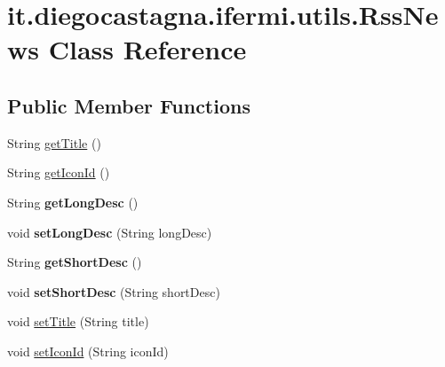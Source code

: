 \hypertarget{classit_1_1diegocastagna_1_1ifermi_1_1utils_1_1_rss_news}{}\section{it.\+diegocastagna.\+ifermi.\+utils.\+Rss\+News Class Reference}
\label{classit_1_1diegocastagna_1_1ifermi_1_1utils_1_1_rss_news}
\subsection*{Public Member Functions}
\begin{DoxyCompactItemize}
\item 
String \mbox{\hyperlink{classit_1_1diegocastagna_1_1ifermi_1_1utils_1_1_rss_news_a440a726406ac659484bbc5abca1e6e58}{get\+Title}} ()
\item 
String \mbox{\hyperlink{classit_1_1diegocastagna_1_1ifermi_1_1utils_1_1_rss_news_a4058acee8ab782ebc158d03d48212040}{get\+Icon\+Id}} ()
\item 
\mbox{\label{classit_1_1diegocastagna_1_1ifermi_1_1utils_1_1_rss_news_afff5862574f4461443ad3ee089ee3859}} 
String {\bfseries get\+Long\+Desc} ()
\item 
\mbox{\label{classit_1_1diegocastagna_1_1ifermi_1_1utils_1_1_rss_news_a10ecc984c3c37c45cad884e74e0a47ca}} 
void {\bfseries set\+Long\+Desc} (String long\+Desc)
\item 
\mbox{\label{classit_1_1diegocastagna_1_1ifermi_1_1utils_1_1_rss_news_ab4b6d8d3951c03872753a1211632ae4e}} 
String {\bfseries get\+Short\+Desc} ()
\item 
\mbox{\label{classit_1_1diegocastagna_1_1ifermi_1_1utils_1_1_rss_news_ae4f8661c4b7cd1685e1d60ea887455fa}} 
void {\bfseries set\+Short\+Desc} (String short\+Desc)
\item 
void \mbox{\hyperlink{classit_1_1diegocastagna_1_1ifermi_1_1utils_1_1_rss_news_a22cb25c50472d9f27b6fb24af94f2605}{set\+Title}} (String title)
\item 
void \mbox{\hyperlink{classit_1_1diegocastagna_1_1ifermi_1_1utils_1_1_rss_news_a137b616216ddb60bfcfb582af74594fc}{set\+Icon\+Id}} (String icon\+Id)
\end{DoxyCompactItemize}



